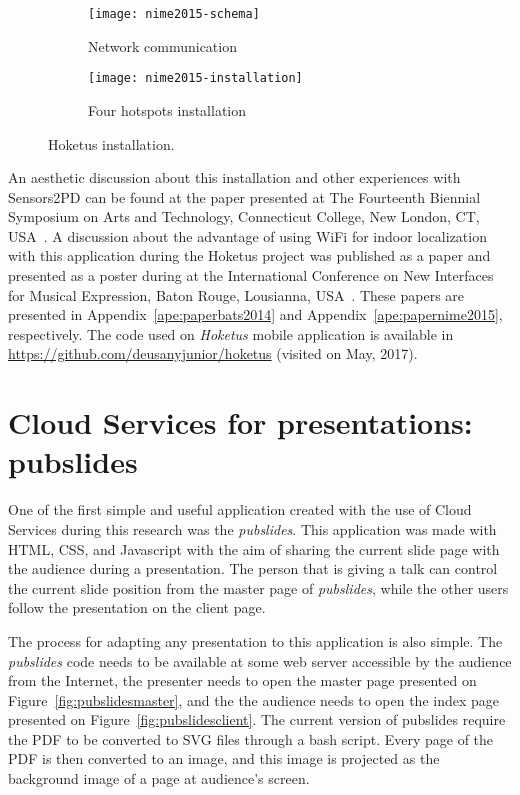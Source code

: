 \begin{figure*}[!ht]
	\centering
	\begin{subfigure}{.45\textwidth}
		\texttt{[image: nime2015-schema]}
		\caption{Network communication}
		\label{fig:installation-schema}
	\end{subfigure}
	\begin{subfigure}{.45\textwidth}
		\texttt{[image: nime2015-installation]}
		\caption{Four hotspots installation}
		\label{fig:installation}
	\end{subfigure}
	
	\caption{Hoketus installation.}
	\label{fig:hoketusinstallation}
\end{figure*}

An aesthetic discussion about this installation and other experiences with Sensors2PD can be found at the paper presented at The Fourteenth Biennial Symposium on Arts and Technology, Connecticut College, New London, CT, USA~\citep{Bandeira2014notes}.
A discussion about the advantage of using WiFi for indoor localization with this application during the Hoketus project was published as a paper and presented as a poster during at the International Conference on New Interfaces for Musical Expression, Baton Rouge, Lousianna, USA~\citep{deCarvalhoJunior2015indoor}.
These papers are presented in Appendix~\ref{ape:paperbats2014} and Appendix~\ref{ape:papernime2015}, respectively.
The code used on \textit{Hoketus} mobile application is available in \url{https://github.com/deusanyjunior/hoketus} (visited on May, 2017).

\section{Cloud Services for presentations: pubslides}
\label{apesec:apppubslides}

One of the first simple and useful application created with the use of Cloud Services during this research was the \textit{pubslides}.
This application was made with HTML, CSS, and Javascript with the aim of sharing the current slide page with the audience during a presentation.
The person that is giving a talk can control the current slide position from the master page of \textit{pubslides}, while the other users follow the presentation on the client page.

The process for adapting any presentation to this application is also simple.
The \textit{pubslides} code needs to be available at some web server accessible by the audience from the Internet, the presenter needs to open the master page presented on Figure~\ref{fig:pubslidesmaster}, and the the audience needs to open the index page presented on Figure~\ref{fig:pubslidesclient}.
The current version of pubslides require the PDF to be converted to SVG files through a bash script.
Every page of the PDF is then converted to an image, and this image is projected as the background image of a page at audience's screen.

